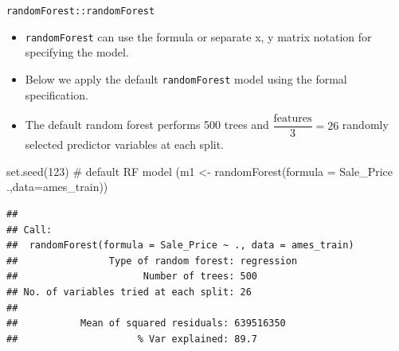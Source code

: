 \documentclass[
  10pt,
  ignorenonframetext,
]{beamer}
\newenvironment{Shaded}{}{}
\newcommand{\CommentTok}[1]{\textcolor[rgb]{0.00,0.50,0.00}{#1}}
\newcommand{\DataTypeTok}[1]{#1}
\newcommand{\DecValTok}[1]{#1}
\newcommand{\KeywordTok}[1]{\textcolor[rgb]{0.00,0.00,1.00}{#1}}
\newcommand{\NormalTok}[1]{#1}
\newcommand{\OperatorTok}[1]{#1}
\newcommand{\StringTok}[1]{\textcolor[rgb]{0.00,0.50,0.50}{#1}}
\providecommand{\tightlist}{%
  \setlength{\itemsep}{0pt}\setlength{\parskip}{0pt}}
\begin{document}
\begin{frame}[fragile]{\texttt{randomForest::randomForest}}
\protect\hypertarget{randomforestrandomforest}{}

\begin{itemize}
\tightlist
\item
  \texttt{randomForest} can use the formula or separate x, y matrix
  notation for specifying the model.
\item
  Below we apply the default \texttt{randomForest} model using the
  formal specification.
\item
  The default random forest performs 500 trees and
  \(\dfrac{\text{features}}{3}=26\) randomly selected predictor
  variables at each split.
\end{itemize}

\begin{Shaded}
\begin{Highlighting}[]
\KeywordTok{set.seed}\NormalTok{(}\DecValTok{123}\NormalTok{)}
\CommentTok{# default RF model}
\NormalTok{(m1 <-}\StringTok{ }\KeywordTok{randomForest}\NormalTok{(}\DataTypeTok{formula =}\NormalTok{ Sale_Price }\OperatorTok{~}\StringTok{ }\NormalTok{.,}\DataTypeTok{data=}\NormalTok{ames_train))}
\end{Highlighting}
\end{Shaded}

\begin{verbatim}
## 
## Call:
##  randomForest(formula = Sale_Price ~ ., data = ames_train) 
##                Type of random forest: regression
##                      Number of trees: 500
## No. of variables tried at each split: 26
## 
##           Mean of squared residuals: 639516350
##                     % Var explained: 89.7
\end{verbatim}

\end{frame}
\end{document}

